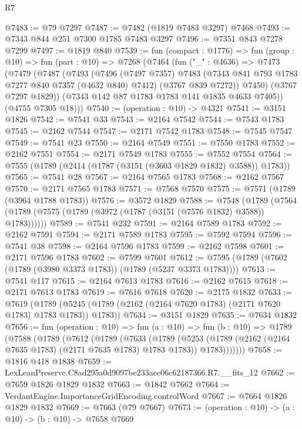 \begin{lexlean}{R7}
\begin{coremodule}
@7483 := @79 @7297
@7487 := @7482 (@1819 @7483 @3297) @7468
@7493 := @7343 @844 @251 @7300 @1785 @7483 @3297
@7496 := @7351 @843 @7278 @7299
@7497 := @1819 @840
@7539 := fun (compact : @1776) =>
  fun (group : @10) =>
  fun (part : @10) =>
  @7268
    (@7464
      (fun ("_" : @4636) =>
      @7473
        (@7479
          (@7487
            (@7493
              (@7496
                (@7497 @7357)
                @7483
                (@7343 @841 @793 @1783 @7277 @840 @7357 (@4632 @840) @7412)
                (@3767 @839 @7272))
              @7450)
            (@3767 @7297 @1829))
          (@7343 @142 @87 @1783 @1783 @141 @1835 @4633 @7405))
        (@4755 @7305 @18)))
@7540 := (operation : @10) -> @4321
@7541 := @3151 @1826
@7542 := @7541 @33
@7543 := @2164 @7542
@7544 := @7543 @1783
@7545 := @2162 @7544
@7547 := @2171 @7542 @1783
@7548 := @7545 @7547
@7549 := @7541 @23
@7550 := @2164 @7549
@7551 := @7550 @1783
@7552 := @2162 @7551
@7554 := @2171 @7549 @1783
@7555 := @7552 @7554
@7564 := @7555 (@1789 (@2414 (@1787 (@3151 (@3603 @1829 @1832) @3588)) @1783))
@7565 := @7541 @28
@7567 := @2164 @7565 @1783
@7568 := @2162 @7567
@7570 := @2171 @7565 @1783
@7571 := @7568 @7570
@7575 := @7571 (@1789 (@3964 @1788 @1783))
@7576 := @3572 @1829
@7588 := @7548
    (@1789 (@7564 (@1789 (@7575 (@1789 (@3972 (@1787 (@3151 (@7576 @1832) @3588)) @1783))))))
@7589 := @7541 @232
@7591 := @2164 @7589 @1783
@7592 := @2162 @7591
@7594 := @2171 @7589 @1783
@7595 := @7592 @7594
@7596 := @7541 @38
@7598 := @2164 @7596 @1783
@7599 := @2162 @7598
@7601 := @2171 @7596 @1783
@7602 := @7599 @7601
@7612 := @7595 (@1789 (@7602 (@1789 (@3980 @3373 @1783)) (@1789 (@5237 @3373 @1783))))
@7613 := @7541 @117
@7615 := @2164 @7613 @1783
@7616 := @2162 @7615
@7618 := @2171 @7613 @1783
@7619 := @7616 @7618
@7620 := @2175 @1832
@7633 := @7619
    (@1789 (@5245 (@1789 (@2162 (@2164 @7620 @1783) (@2171 @7620 @1783) @1783 @1783)) @1783))
@7634 := @3151 @1829
@7635 := @7634 @1832
@7656 := fun (operation : @10) =>
  fun (a : @10) =>
  fun (b : @10) =>
  @1789
    (@7588
      (@1789
        (@7612
          (@1789
            (@7633
              (@1789
                (@5253
                  (@1789 (@2162 (@2164 @7635 @1783) (@2171 @7635 @1783) @1783 @1783))
                  @1783)))))))
@7658 := @1816 @418 @1838
@7659 := LexLeanPreserve.C8ad295a0d9097be233aee06c62187366.R7.__fits_12
@7662 := @7659 @1826 @1829 @1832
@7663 := @1842 @7662
@7664 := VerdantEngine.ImportanceGridEncoding.controlWord
@7667 := @7664 @1826 @1829 @1832
@7669 := @7663 (@79 @7667)
@7673 := (operation : @10) -> (a : @10) -> (b : @10) -> @7658 @7669

\end{coremodule}
\end{lexlean}
